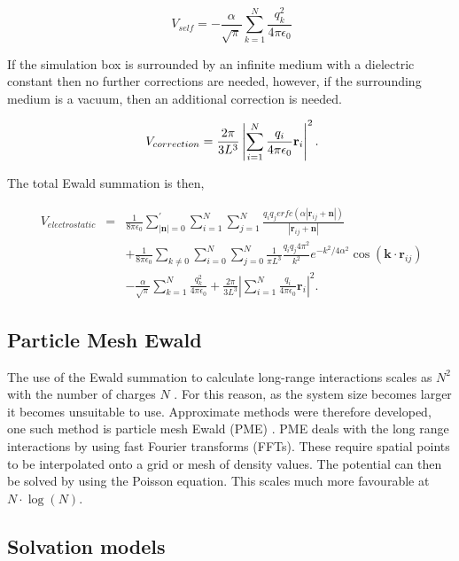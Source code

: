 \begin{equation}
 \ V_{self}=-\frac{\alpha}{\sqrt{\pi}}\sum_{k=1}^{N}\frac{q_k^2}{4\pi\epsilon_0}
\end{equation}

If the simulation box is surrounded by an infinite medium with a dielectric constant then no further corrections are needed, however, if the surrounding medium is a vacuum, then an additional correction is needed.

\begin{equation}
 \ V_{correction}=\frac{2\pi}{3L^3}\left| \sum_{i=1}^{N}\frac{q_i}{4\pi\epsilon_0} \textbf{r}_i \right|^2 \\.
\end{equation}


The total Ewald summation is then,

\begin{eqnarray}
 \ V_{electrostatic}&=&\frac{1}{8\pi \epsilon_0}\sum_{|\textbf{n}|=0}^\prime \sum_{i=1}^{N} \sum_{j=1}^{N} \frac{q_iq_jerfc(\alpha|\textbf{r}_{ij}+\textbf{n}|)}{|\textbf{r}_{ij}+\textbf{n}|} \nonumber \\
&&+\frac{1}{8\pi\epsilon_0} \sum_{k\neq0}\sum_{i=0}^{N}\sum_{j=0}^{N}\frac{1}{\pi L^3}\frac{q_iq_j4\pi^2}{k^2}e^{-k^2/4\alpha^2}\cos(\textbf{k}\cdot\textbf{r}_{ij}) \nonumber \\
&& -\frac{\alpha}{\sqrt{\pi}}\sum_{k=1}^{N}\frac{q_k^2}{4\pi\epsilon_0}+\frac{2\pi}{3L^3}\left| \sum_{i=1}^{N}\frac{q_i}{4\pi\epsilon_0} \textbf{r}_i \right|^2 .
\end{eqnarray}


\subsection{Particle Mesh Ewald}

The use of the Ewald summation to calculate long-range interactions scales as $N^2$ with the number of charges $N$ \cite{berendsen}.  For this reason, as the system size becomes larger it becomes unsuitable to use.  Approximate methods were therefore developed, one such method is particle mesh Ewald (PME) \cite{PME}.  PME deals with the long range interactions by using fast Fourier transforms (FFTs).  These require spatial points to be interpolated onto a grid or mesh of density values.  The potential can then be solved by using the Poisson equation.  This scales much more favourable at $N\cdot \log (N)$.

\subsection{Solvation models}

